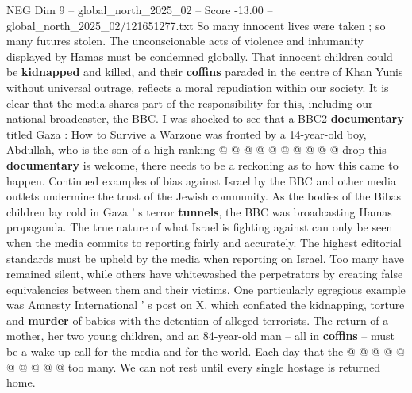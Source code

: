 \begin{textsample}{NEG Dim 9 – global\_north\_2025\_02 – Score -13.00 – global\_north\_2025\_02/121651277.txt}
So many innocent lives were taken ; so many futures stolen.
The unconscionable acts of violence and inhumanity displayed by Hamas must be condemned globally.
That innocent children could be \textbf{kidnapped} and killed, and their \textbf{coffins} paraded in the centre of Khan Yunis without universal outrage, reflects a moral repudiation within our society.
It is clear that the media shares part of the responsibility for this, including our national broadcaster, the BBC.
I was shocked to see that a BBC2 \textbf{documentary} titled Gaza : How to Survive a Warzone was fronted by a 14-year-old boy, Abdullah, who is the son of a high-ranking @ @ @ @ @ @ @ @ @ @ drop this \textbf{documentary} is welcome, there needs to be a reckoning as to how this came to happen.
Continued examples of bias against Israel by the BBC and other media outlets undermine the trust of the Jewish community.
As the bodies of the Bibas children lay cold in Gaza ' s terror \textbf{tunnels}, the BBC was broadcasting Hamas propaganda.
The true nature of what Israel is fighting against can only be seen when the media commits to reporting fairly and accurately.
The highest editorial standards must be upheld by the media when reporting on Israel.
Too many have remained silent, while others have whitewashed the perpetrators by creating false equivalencies between them and their victims.
One particularly egregious example was Amnesty International ' s post on X, which conflated the kidnapping, torture and \textbf{murder} of babies with the detention of alleged terrorists.
The return of a mother, her two young children, and an 84-year-old man -- all in \textbf{coffins} -- must be a wake-up call for the media and for the world.
Each day that the @ @ @ @ @ @ @ @ @ @ too many.
We can not rest until every single hostage is returned home.

\end{textsample}
